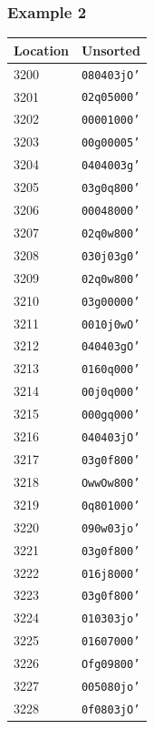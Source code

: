 \newpage

\subsubsection*{Example 2}
\begin{table}[h!]
\centering
\begin{minipage}{0.48\textwidth}
\centering
\begin{tabular}{ll}
\toprule
\textbf{Location} & \textbf{Unsorted} \\
\midrule
3200 & \texttt{080403jO'} \\
3201 & \texttt{02q05000'} \\
3202 & \texttt{00001000'} \\
3203 & \texttt{00g00005'} \\
\midrule
3204 & \texttt{0404003g'} \\
3205 & \texttt{03g0q800'} \\
3206 & \texttt{00048000'} \\
3207 & \texttt{02q0w800'} \\
\midrule
3208 & \texttt{030j03g0'} \\
3209 & \texttt{02q0w800'} \\
3210 & \texttt{03g00000'} \\
3211 & \texttt{0010j0wO'} \\
\midrule
3212 & \texttt{040403gO'} \\
3213 & \texttt{0160q000'} \\
3214 & \texttt{00j0q000'} \\
3215 & \texttt{000gq000'} \\
\midrule
3216 & \texttt{040403jO'} \\
3217 & \texttt{03g0f800'} \\
3218 & \texttt{OwwOw800'} \\
3219 & \texttt{0q801000'} \\
\midrule
3220 & \texttt{090w03jo'} \\
3221 & \texttt{03g0f800'} \\
3222 & \texttt{016j8000'} \\
3223 & \texttt{03g0f800'} \\
\midrule
3224 & \texttt{010303jo'} \\
3225 & \texttt{01607000'} \\
3226 & \texttt{Ofg09800'} \\
3227 & \texttt{005080jo'} \\
\midrule
3228 & \texttt{0f0803jO'} \\

\end{tabular}
\end{minipage}
\end{table}

